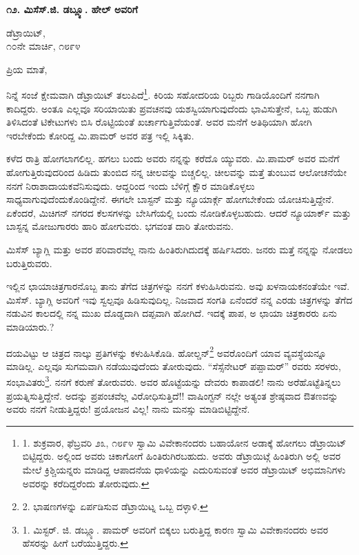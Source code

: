 \begin{center}
\textbf{೧೨. ಮಿಸೆಸ್.ಜಿ. ಡಬ್ಲ್ಯೂ. ಹೇಲ್ ಅವರಿಗೆ}
\end{center}

\begin{flushright}
ಡೆಟ್ರಾಯಿಟ್,\\೧೦ನೇ ಮಾರ್ಚಿ, ೧೮೯೪
\end{flushright}

ಪ್ರಿಯ ಮಾತೆ,

ನಿನ್ನೆ ಸಂಜೆ ಕ್ಷೇಮವಾಗಿ ಡೆಟ್ರಾಯಿಟ್ ತಲುಪಿದೆ\footnote{1. ಶುಕ್ರವಾರ, ಫೆಬ್ರವರಿ ೨೩, ೧೮೯೪ ಸ್ವಾಮಿ ವಿವೇಕಾನಂದರು ಬಹಾಯೋನ ಅಡಾಕ್ಕೆ ಹೋಗಲು ಡೆಟ್ರಾಯಿಟ್ ಬಿಟ್ಟಿದ್ದರು. ಅಲ್ಲಿಂದ ಅವರು ಚಿಕಾಗೋಗೆ ಹಿಂತಿರುಗಿರಬಹುದು. ಅವರು ಡೆಟ್ರಾಯಿಟ್ಗೆ ಹಿಂತಿರುಗಿ ಅಲ್ಲಿ ಅವರ ಮೇಲೆ ಕ್ರಿಶ್ಚಿಯನ್ನರು ಮಾಡಿದ್ದ ಆಪಾದನೆಯ ಧಾಳಿಯನ್ನು ಎದುರಿಸುವಂತೆ ಅವರ ಡೆಟ್ರಾಯಿಟ್ ಅಭಿಮಾನಿಗಳು ಅವರನ್ನು ಕರೆದಿದ್ದರೆಂದು ತೋರುವುದು.}. ಕಿರಿಯ ಸಹೋದರಿಯ ರಿಬ್ಬರು ಗಾಡಿಯೊಂದಿಗೆ ನನಗಾಗಿ ಕಾದಿದ್ದರು. ಅಂತೂ ಎಲ್ಲವೂ ಸರಿಯಾಯಿತು ಪ್ರವಚನವು ಯಶಸ್ವಿಯಾಗುವುದೆಂದು ಭಾವಿಸುತ್ತೇನೆ, ಒಬ್ಬ ಹುಡುಗಿ ತಿಳಿಸಿದಂತೆ ಟಿಕೇಟುಗಳು ಬಿಸಿ ರೊಟ್ಟಿಯಂತೆ ಖರ್ಚಾಗುತ್ತಿವೆಯಂತೆ. ಅವರ ಮನೆಗೆ ಅತಿಥಿಯಾಗಿ ಹೋಗಿ ಇರಬೇಕೆಂದು ಕೋರಿದ್ದ ಮಿ.ಪಾಮರ್ ಅವರ ಪತ್ರ ಇಲ್ಲಿ ಸಿಕ್ಕಿತು.

ಕಳೆದ ರಾತ್ರಿ ಹೋಗಲಾಗಲಿಲ್ಲ. ಹಗಲು ಬಂದು ಅವರು ನನ್ನನ್ನು ಕರೆದೊ ಯ್ಯುವರು. ಮಿ.ಪಾಮರ್ ಅವರ ಮನೆಗೆ ಹೋಗುತ್ತಿರುವುದರಿಂದ ಹಿಡಿದು ತುಂಬಿದ ನನ್ನ ಚೀಲವನ್ನು ಬಿಚ್ಚಲಿಲ್ಲ. ಚೀಲವನ್ನು ಮತ್ತೆ ತುಂಬುವ ಆಲೋಚನೆಯೇ ನನಗೆ ನಿರಾಶಾದಾಯಕವೆನಿಸುವುದು. ಆದ್ದರಿಂದ ಇಂದು ಬೆಳಿಗ್ಗೆ ಕ್ಷೌರ ಮಾಡಿಕೊಳ್ಳಲು ಸಾಧ್ಯವಾಗುವುದೆಂದುಕೊಂಡಿದ್ದೇನೆ. ಈಗಲೇ ಬಾಸ್ಟನ್ ಮತ್ತು ನ್ಯೂಯಾರ್ಕ್ಗೆ ಹೋಗಬೇಕೆಂದು ಯೋಚಿಸುತ್ತಿದ್ದೇನೆ. ಏಕೆಂದರೆ, ಮಿಚಿಗನ್ ನಗರದ ಕೆಲಸಗಳನ್ನು ಬೇಸಿಗೆಯಲ್ಲಿ ಬಂದು ನೋಡಿಕೊಳ್ಳಬಹುದು. ಆದರೆ ನ್ಯೂಯಾರ್ಕ್ ಮತ್ತು ಬಾಸ್ಟನ್ನ ಮೋಜುಗಾರರು ಹಾರಿ ಹೋಗುವರು. ಭಗವಂತ ದಾರಿ ತೋರುವನು.

ಮಿಸೆಸ್ ಬ್ಯಾಗ್ಲಿ ಮತ್ತು ಅವರ ಪರಿವಾರವೆಲ್ಲ ನಾನು ಹಿಂತಿರುಗಿದುದಕ್ಕೆ ಹರ್ಷಿಸಿದರು. ಜನರು ಮತ್ತೆ ನನ್ನನ್ನು ನೋಡಲು ಬರುತ್ತಿರುವರು.

ಇಲ್ಲಿನ ಛಾಯಾಚಿತ್ರಗಾರನೊಬ್ಬ ತಾನು ತೆಗೆದ ಚಿತ್ರಗಳನ್ನು ನನಗೆ ಕಳುಹಿಸಿರುವನು. ಅವು ಖಳನಾಯಕನಂತೆಯೇ ಇವೆ. ಮಿಸೆಸ್. ಬ್ಯಾಗ್ಲಿ ಅವರಿಗೆ ಇವು ಸ್ವಲ್ಪವೂ ಹಿಡಿಸುವುದಿಲ್ಲ. ನಿಜವಾದ ಸಂಗತಿ ಏನೆಂದರೆ ನನ್ನ ಎರಡು ಚಿತ್ರಗಳನ್ನು ತೆಗೆದ ನಡುವಿನ ಕಾಲದಲ್ಲಿ ನನ್ನ ಮುಖ ದೊಡ್ಡದಾಗಿ ದಪ್ಪವಾಗಿ ಹೋಗಿದೆ. ಇದಕ್ಕೆ ಪಾಪ, ಅ ಛಾಯಾ ಚಿತ್ರಕಾರರು ಏನು ಮಾಡಿಯಾರು.?

ದಯವಿಟ್ಟು ಆ ಚಿತ್ರದ ನಾಲ್ಕು ಪ್ರತಿಗಳನ್ನು ಕಳುಹಿಸಿಕೊಡಿ. ಹೋಲ್ಡನ್\footnote{2. ಭಾಷಣಗಳನ್ನು ಏರ್ಪಡಿಸುವ ಡೆಟ್ರಾಯಿಟ್ನ ಒಬ್ಬ ದಳ್ಳಾಳಿ.} ಅವರೊಂದಿಗೆ ಯಾವ ವ್ಯವಸ್ಥೆಯನ್ನೂ ಮಾಡಿಲ್ಲ. ಎಲ್ಲವೂ ಸುಗಮವಾಗಿ ನಡೆಯುವುದೆಂದು ತೋರುವುದು. “ಸೆಸ್ಸೆನೇಟರ್ ಪಪ್ಪಾಮರ್” ರವರು ಸರಳರು, ಸಂಭಾವಿತರು\footnote{1. ಮಿಸ್ಟರ್. ಜಿ. ಡಬ್ಲ್ಯೂ. ಪಾಮರ್ ಅವರಿಗೆ ಬಿಕ್ಕಲು ಬರುತ್ತಿದ್ದ ಕಾರಣ ಸ್ವಾಮಿ ವಿವೇಕಾನಂದರು ಅವರ ಹೆಸರನ್ನು ಹೀಗೆ ಬರೆಯುತ್ತಿದ್ದರು.}. ನನಗೆ ಕರುಣೆ ತೋರುವರು. ಅವರ ಹೊಟ್ಟೆಯನ್ನು ದೇವರು ಕಾಪಾಡಲಿ! ನಾನು ಅರೆಹೊಟ್ಟೆತಿನ್ನಲು ಪ್ರಯತ್ನಿಸುತ್ತಿದ್ದೇನೆ. ಅದನ್ನು ಪ್ರಪಂಚವೆಲ್ಲ ವಿರೋಧಿಸುತ್ತಿದೆ!! ವಾಷಿಂಗ್ಟನ್ ನಲ್ಲೇ ಅತ್ಯಂತ ಶ್ರೇಷ್ಠವಾದ ಔತಣವನ್ನು ಅವರು ನನಗೆ ನೀಡುತ್ತಿದ್ದರು! ಪ್ರಯೋಜನ ವಿಲ್ಲ! ನಾನು ಮನಸ್ಸು ಮಾಡಿಬಿಟ್ಟಿದ್ದೇನೆ.

